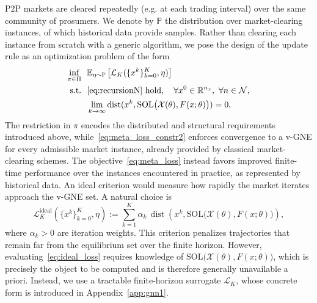 \documentclass[final]{l4dc2026}
\begin{document}
P2P markets are cleared repeatedly (e.g. at each trading interval) over the same community of prosumers. We denote by $\mathbb{P}$ the distribution over market-clearing instances, of which historical data provide samples. Rather than clearing each instance from scratch with a generic algorithm, we pose the design of the update rule as an optimization problem of the form
%
\begin{subequations}
\label{eq:optimal-iteration-design-problem}
     \begin{align}
         \label{eq:meta_loss}
          \inf_{\pi \in \Pi} &~~ \mathbb{E}_{\eta \sim \mathbb{P}} \left[\mathcal{L}_K(\{x^k\}_{k=0}^{K}, \eta)\right]\\
         \text{s.t.} &~~ \eqref{eq:recursionN} \text{ hold},
  \quad \forall x^0 \in \mathbb{R}^{n_x},~ \forall n \in \mathcal{N}, \label{eq:meta_loss_constr1}\\
         &~~ \lim_{k \to \infty}\operatorname{dist}(x^k, \mathrm{SOL}\big(\mathcal{X}(\theta),   F(x;\theta)\big)) = 0,\label{eq:meta_loss_constr2}%
         \end{align}
 \end{subequations}
%
The restriction in $\pi$ encodes the distributed and structural requirements introduced above, while~\eqref{eq:meta_loss_constr2} enforces convergence to a v-GNE for every admissible market instance, already provided by classical market-clearing schemes. The objective~\eqref{eq:meta_loss} instead favors improved finite-time performance over the instances encountered in practice, as represented by historical data. An ideal criterion would measure how rapidly the market iterates approach the v-GNE set. A natural choice is
%
\begin{equation}
\label{eq:ideal_loss}
    \mathcal{L}^{\mathrm{ideal}}_K
    \left(\{x^k\}_{k=0}^{K},\eta\right)
    :=
    \sum_{k=1}^{K}
    \alpha_k\,
    \operatorname{dist}
    \left(x^k,\mathrm{SOL}\big(\mathcal{X}(\theta),   F(x;\theta)\big)\right),
\end{equation}
%
where $\alpha_k>0$ are iteration weights. This criterion penalizes trajectories that remain far from the equilibrium set over the finite horizon.  However, evaluating~\eqref{eq:ideal_loss} requires knowledge of $\mathrm{SOL}\big(\mathcal{X}(\theta),   F(x;\theta)\big)$, which is precisely the object to be computed and is therefore generally unavailable a priori. Instead, we use a tractable finite-horizon surrogate $\mathcal{L}_K$, whose concrete form is introduced in Appendix~\ref{app:gnn1}.
\end{document}
